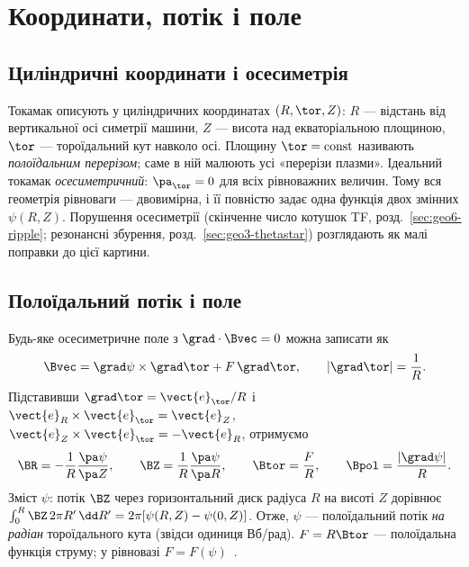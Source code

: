 \chapter{Координати, потік і поле}\label{ch:geo2}

\section{Циліндричні координати і осесиметрія}\label{sec:geo2-cyl}

Токамак описують у циліндричних координатах $(R,\tor,Z)$: $R$ --- відстань від вертикальної осі симетрії машини, $Z$ --- висота над екваторіальною площиною, $\tor$ --- тороїдальний кут навколо осі. Площину $\tor=\text{const}$ називають \emph{полоїдальним перерізом}; саме в ній малюють усі «перерізи плазми». Ідеальний токамак \emph{осесиметричний}: $\pa_\tor=0$ для всіх рівноважних величин. Тому вся геометрія рівноваги --- двовимірна, і її повністю задає одна функція двох змінних $\psi(R,Z)$. Порушення осесиметрії (скінченне число котушок TF, розд.~\ref{sec:geo6-ripple}; резонансні збурення, розд.~\ref{sec:geo3-thetastar}) розглядають як малі поправки до цієї картини.

\section{Полоїдальний потік і поле}\label{sec:geo2-psi}

\begin{outofcorpus}
Будь-яке осесиметричне поле з $\grad\cdot\Bvec=0$ можна записати як
\begin{equation}\label{eq:geo2-B}
\Bvec=\grad\psi\times\grad\tor+F\,\grad\tor,\qquad |\grad\tor|=\frac1R .
\end{equation}
Підставивши $\grad\tor=\vect{e}_\tor/R$ і $\vect{e}_R\times\vect{e}_\tor=\vect{e}_Z$, $\vect{e}_Z\times\vect{e}_\tor=-\vect{e}_R$, отримуємо
\begin{equation}\label{eq:geo2-comp}
\BR=-\frac1R\frac{\pa\psi}{\pa Z},\qquad \BZ=\frac1R\frac{\pa\psi}{\pa R},\qquad \Btor=\frac{F}{R},\qquad \Bpol=\frac{|\grad\psi|}{R}.
\end{equation}
Зміст $\psi$: потік $\BZ$ через горизонтальний диск радіуса $R$ на висоті $Z$ дорівнює $\int_0^R\BZ\,2\pi R'\,\dd R'=2\pi[\psi(R,Z)-\psi(0,Z)]$. Отже, $\psi$ --- полоїдальний потік \emph{на радіан} тороїдального кута (звідси одиниця Вб/рад). $F=R\Btor$ --- полоїдальна функція струму; у рівновазі $F=F(\psi)$~\cite[розд.~3]{Manual}.
\end{outofcorpus}

